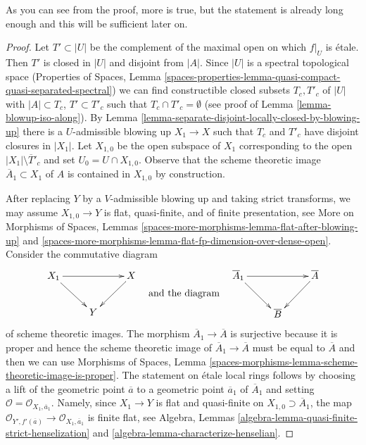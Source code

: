 \documentclass{stacks-project}
\theoremstyle{plain}
\theoremstyle{definition}
\theoremstyle{remark}
\numberwithin{equation}{subsection}
\begin{document}
\noindent
As you can see from the proof, more is true, but the statement is
already long enough and this will be sufficient later on.

\begin{proof}
Let $T' \subset |U|$ be the complement of the maximal open on which
$f|_U$ is \'etale. Then $T'$ is closed in $|U|$ and disjoint from $|A|$.
Since $|U|$ is a spectral topological space (Properties of Spaces, Lemma
\ref{spaces-properties-lemma-quasi-compact-quasi-separated-spectral})
we can find constructible closed subsets $T_c, T'_c$ of $|U|$
with $|A| \subset T_c$, $T' \subset T'_c$ such that
$T_c \cap T'_c = \emptyset$ (see proof of Lemma \ref{lemma-blowup-iso-along}).
By Lemma \ref{lemma-separate-disjoint-locally-closed-by-blowing-up}
there is a $U$-admissible blowing up $X_1 \to X$ such that
$T_c$ and $T'_c$ have disjoint closures in $|X_1|$.
Let $X_{1, 0}$ be the open subspace of $X_1$ corresponding to the open
$|X_1| \setminus \overline{T}'_c$ and set $U_0 = U \cap X_{1, 0}$.
Observe that the scheme theoretic image $\overline{A}_1 \subset X_1$
of $A$ is contained in $X_{1, 0}$ by construction.

\medskip\noindent
After replacing $Y$ by a $V$-admissible blowing up and taking
strict transforms, we may assume $X_{1, 0} \to Y$ is flat, quasi-finite,
and of finite presentation, see
More on Morphisms of Spaces, Lemmas
\ref{spaces-more-morphisms-lemma-flat-after-blowing-up} and
\ref{spaces-more-morphisms-lemma-flat-fp-dimension-over-dense-open}.
Consider the commutative diagram
$$
\vcenter{
\xymatrix{
X_1 \ar[rr] \ar[rd] & & X \ar[ld] \\
& Y
}
}
\quad\text{and the diagram}\quad
\vcenter{
\xymatrix{
\overline{A}_1 \ar[rr] \ar[rd] & & \overline{A} \ar[ld] \\
& \overline{B}
}
}
$$
of scheme theoretic images. The morphism $\overline{A}_1 \to \overline{A}$
is surjective because it is proper and hence the scheme theoretic
image of $\overline{A}_1 \to \overline{A}$ must be equal to $\overline{A}$
and then we can use Morphisms of Spaces, Lemma
\ref{spaces-morphisms-lemma-scheme-theoretic-image-is-proper}.
The statement on \'etale local rings follows
by choosing a lift of the geometric point $\overline{a}$
to a geometric point $\overline{a}_1$ of $\overline{A}_1$ and setting
$\mathcal{O} = \mathcal{O}_{X_1, \overline{a}_1}$. Namely, since
$X_1 \to Y$ is flat and quasi-finite on
$X_{1, 0} \supset \overline{A}_1$, the map
$\mathcal{O}_{Y', f'(\overline{a})} \to \mathcal{O}_{X_1, \overline{a}_1}$
is finite flat, see Algebra, Lemmas
\ref{algebra-lemma-quasi-finite-strict-henselization}
and \ref{algebra-lemma-characterize-henselian}.
\end{proof}
\end{document}
